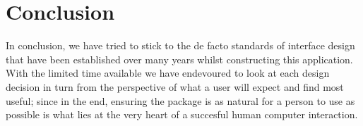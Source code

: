 \section{Conclusion}
In conclusion, we have tried to stick to the de facto standards of interface design that have been established over many years whilst constructing this application.  With the limited time available we have endevoured to look at each design decision in turn from the perspective of what a user will expect and find most useful; since in the end, ensuring the package is as natural for a person to use as possible is what lies at the very heart of a succesful human computer interaction.